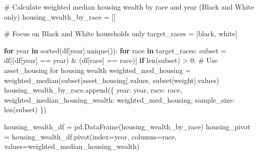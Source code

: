 \documentclass[
  letterpaper,
  DIV=11,
  numbers=noendperiod]{scrartcl}
\newenvironment{Shaded}{\begin{snugshade}}{\end{snugshade}}
\newcommand{\BuiltInTok}[1]{\textcolor[rgb]{0.00,0.23,0.31}{#1}}
\newcommand{\CommentTok}[1]{\textcolor[rgb]{0.37,0.37,0.37}{#1}}
\newcommand{\ControlFlowTok}[1]{\textcolor[rgb]{0.00,0.23,0.31}{\textbf{#1}}}
\newcommand{\DecValTok}[1]{\textcolor[rgb]{0.68,0.00,0.00}{#1}}
\newcommand{\KeywordTok}[1]{\textcolor[rgb]{0.00,0.23,0.31}{\textbf{#1}}}
\newcommand{\NormalTok}[1]{\textcolor[rgb]{0.00,0.23,0.31}{#1}}
\newcommand{\OperatorTok}[1]{\textcolor[rgb]{0.37,0.37,0.37}{#1}}
\newcommand{\StringTok}[1]{\textcolor[rgb]{0.13,0.47,0.30}{#1}}
\begin{document}
\begin{Shaded}
\begin{Highlighting}[]
\CommentTok{\# Calculate weighted median housing wealth by race and year (Black and White only)}
\NormalTok{housing\_wealth\_by\_race }\OperatorTok{=}\NormalTok{ []}

\CommentTok{\# Focus on Black and White households only}
\NormalTok{target\_races }\OperatorTok{=}\NormalTok{ [}\StringTok{\textquotesingle{}black\textquotesingle{}}\NormalTok{, }\StringTok{\textquotesingle{}white\textquotesingle{}}\NormalTok{]}

\ControlFlowTok{for}\NormalTok{ year }\KeywordTok{in} \BuiltInTok{sorted}\NormalTok{(df[}\StringTok{\textquotesingle{}year\textquotesingle{}}\NormalTok{].unique()):}
    \ControlFlowTok{for}\NormalTok{ race }\KeywordTok{in}\NormalTok{ target\_races:}
\NormalTok{        subset }\OperatorTok{=}\NormalTok{ df[(df[}\StringTok{\textquotesingle{}year\textquotesingle{}}\NormalTok{] }\OperatorTok{==}\NormalTok{ year) }\OperatorTok{\&}\NormalTok{ (df[}\StringTok{\textquotesingle{}race\textquotesingle{}}\NormalTok{] }\OperatorTok{==}\NormalTok{ race)]}
        \ControlFlowTok{if} \BuiltInTok{len}\NormalTok{(subset) }\OperatorTok{\textgreater{}} \DecValTok{0}\NormalTok{:}
            \CommentTok{\# Use asset\_housing for housing wealth}
\NormalTok{            weighted\_med\_housing }\OperatorTok{=}\NormalTok{ weighted\_median(subset[}\StringTok{\textquotesingle{}asset\_housing\textquotesingle{}}\NormalTok{].values, subset[}\StringTok{\textquotesingle{}weight\textquotesingle{}}\NormalTok{].values)}
\NormalTok{            housing\_wealth\_by\_race.append(\{}
                \StringTok{\textquotesingle{}year\textquotesingle{}}\NormalTok{: year,}
                \StringTok{\textquotesingle{}race\textquotesingle{}}\NormalTok{: race,}
                \StringTok{\textquotesingle{}weighted\_median\_housing\_wealth\textquotesingle{}}\NormalTok{: weighted\_med\_housing,}
                \StringTok{\textquotesingle{}sample\_size\textquotesingle{}}\NormalTok{: }\BuiltInTok{len}\NormalTok{(subset)}
\NormalTok{            \})}

\NormalTok{housing\_wealth\_df }\OperatorTok{=}\NormalTok{ pd.DataFrame(housing\_wealth\_by\_race)}
\NormalTok{housing\_pivot }\OperatorTok{=}\NormalTok{ housing\_wealth\_df.pivot(index}\OperatorTok{=}\StringTok{\textquotesingle{}year\textquotesingle{}}\NormalTok{, columns}\OperatorTok{=}\StringTok{\textquotesingle{}race\textquotesingle{}}\NormalTok{, values}\OperatorTok{=}\StringTok{\textquotesingle{}weighted\_median\_housing\_wealth\textquotesingle{}}\NormalTok{)}


\end{Highlighting}
\end{Shaded}
\end{document}
